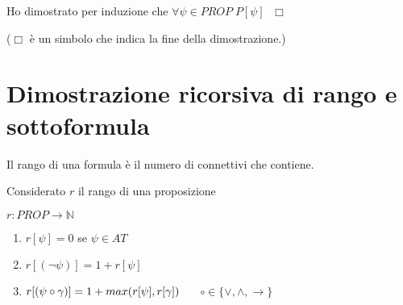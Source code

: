 \documentclass{article}
\theoremstyle{break}
\theoremstyle{break}
\theoremstyle{break}
\theoremstyle{break}
\begin{document}
Ho dimostrato per induzione che \( \forall \psi \in PROP \; P[\psi] \; \) \( \Box \)

(\( \Box \) è un simbolo che indica la fine della dimostrazione.)

\section{Dimostrazione ricorsiva di rango e sottoformula}
Il rango di una formula è il numero di connettivi che contiene.
\begin{definition}
	Considerato \( r \) il rango di una proposizione

	\( r: PROP \to \mathbb{N} \)

	\begin{enumerate}
		\item \( r[\psi] = 0 \) se \( \psi \in AT \)
		\item \( r[(\neg \psi)] = 1 + r[\psi] \)
		\item \( r[(\psi \circ \gamma )] = 1 + max(r[\psi], r[\gamma]) \hspace{5mm} \) \( \circ \in \{\vee, \wedge, \to \} \)

	\end{enumerate}
\end{definition}
\end{document}
